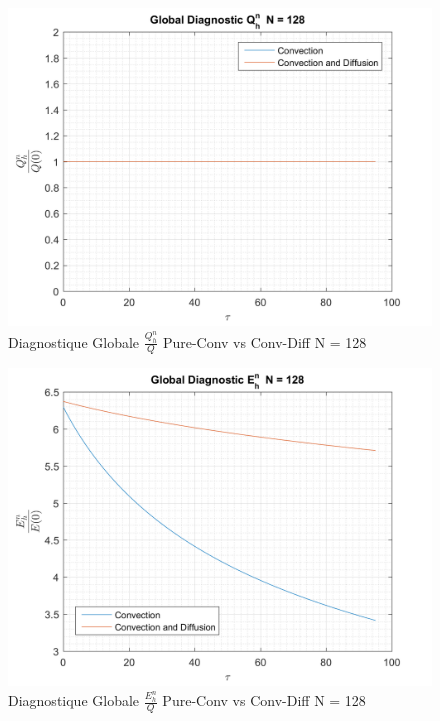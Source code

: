 \documentclass{article}
\begin{document}
\begin{figure}[H]
    \centering
    \includegraphics[scale=0.45]{img/fig8b.png}
    \caption{Diagnostique Globale $\frac{Q_h^n}{Q}$ Pure-Conv vs Conv-Diff N = 128}
    \label{fig8c}
\end{figure}
\begin{figure}[H]
    \centering
    \includegraphics[scale=0.45]{img/fig8c.png}
    \caption{Diagnostique Globale $\frac{E_h^n}{Q}$ Pure-Conv vs Conv-Diff N = 128}
    \label{fig8c}
\end{figure}
\end{document}
